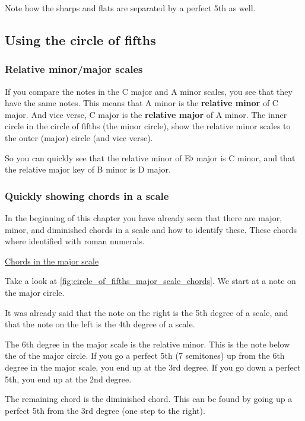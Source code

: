 Note how the sharps and flats are separated by a perfect 5th as well.

\newpage

\subsection{Using the circle of fifths}

\subsubsection{Relative minor/major scales}

If you compare the notes in the C major and A minor scales, you see that they have the same notes. This means that A minor is the \textbf{relative minor} of C major. And vice verse, C major is the \textbf{relative major} of A minor. The inner circle in the circle of fifths (the minor circle), show the relative minor scales to the outer (major) circle (and vice verse).

So you can quickly see that the relative minor of E$\flat$ major is C minor, and that the relative major key of B minor is D major.

\subsubsection{Quickly showing chords in a scale}

In the beginning of this chapter you have already seen that there are major, minor, and diminished chords in a scale and how to identify these. These chords where identified with roman numerals.

\underline{Chords in the major scale}

Take a look at \autoref{fig:circle_of_fifths_major_scale_chords}. We start at a note on the major circle.

It was already said that the note on the right is the 5th degree of a scale, and that the note on the left is the 4th degree of a scale.

The 6th degree in the major scale is the relative minor. This is the note below the  of the major circle. If you go a perfect 5th (7 semitones) up from the 6th degree in the major scale, you end up at the 3rd degree. If you go down a perfect 5th, you end up at the 2nd degree.

The remaining chord is the diminished chord. This can be found by going up a perfect 5th from the 3rd degree (one step to the right). 

